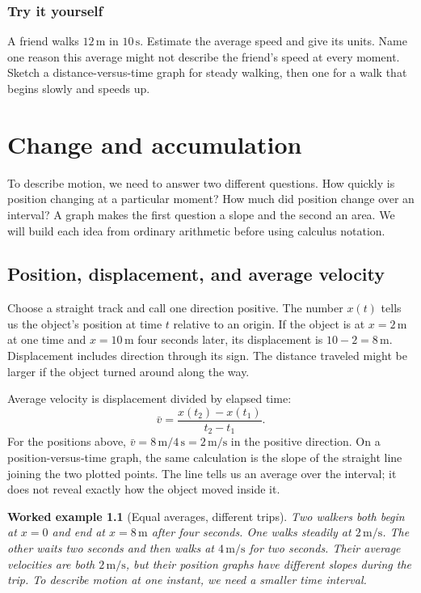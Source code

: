 \documentclass[11pt,oneside]{book}
\theoremstyle{reviewstyle}
\newtheorem{example}{Worked example}[chapter]
\newcommand{\learningcheck}[1]{\subsection*{Try it yourself}\noindent #1\par}
\begin{document}
\learningcheck{A friend walks $12\,\mathrm m$ in $10\,\mathrm s$. Estimate the average speed and give its units. Name one reason this average might not describe the friend's speed at every moment. Sketch a distance-versus-time graph for steady walking, then one for a walk that begins slowly and speeds up.}

\chapter{Change and accumulation}
To describe motion, we need to answer two different questions. How quickly is position changing at a particular moment? How much did position change over an interval? A graph makes the first question a slope and the second an area. We will build each idea from ordinary arithmetic before using calculus notation.

\section{Position, displacement, and average velocity}
Choose a straight track and call one direction positive. The number $x(t)$ tells us the object's position at time $t$ relative to an origin. If the object is at $x=2\,\mathrm m$ at one time and $x=10\,\mathrm m$ four seconds later, its displacement is $10-2=8\,\mathrm m$. Displacement includes direction through its sign. The distance traveled might be larger if the object turned around along the way.

Average velocity is displacement divided by elapsed time:
\begin{equation}
\bar v=\frac{x(t_2)-x(t_1)}{t_2-t_1}.
\end{equation}
For the positions above, $\bar v=8\,\mathrm m/4\,\mathrm s=2\,\mathrm{m/s}$ in the positive direction. On a position-versus-time graph, the same calculation is the slope of the straight line joining the two plotted points. The line tells us an average over the interval; it does not reveal exactly how the object moved inside it.

\begin{example}[Equal averages, different trips]
Two walkers both begin at $x=0$ and end at $x=8\,\mathrm m$ after four seconds. One walks steadily at $2\,\mathrm{m/s}$. The other waits two seconds and then walks at $4\,\mathrm{m/s}$ for two seconds. Their average velocities are both $2\,\mathrm{m/s}$, but their position graphs have different slopes during the trip. To describe motion at one instant, we need a smaller time interval.
\end{example}
\end{document}

